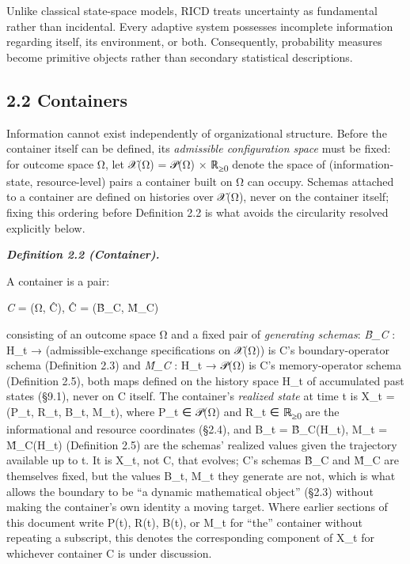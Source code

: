 \documentclass[
]{article}
\begin{document}
Unlike classical state-space models, RICD treats uncertainty as
fundamental rather than incidental. Every adaptive system possesses
incomplete information regarding itself, its environment, or both.
Consequently, probability measures become primitive objects rather than
secondary statistical descriptions.

\hypertarget{containers}{%
\subsection{2.2 Containers}\label{containers}}

Information cannot exist independently of organizational structure.
Before the container itself can be defined, its \emph{admissible
configuration space} must be fixed: for outcome space Ω, let 𝒳(Ω) = 𝒫(Ω)
× ℝ\textsubscript{≥0} denote the space of (information-state,
resource-level) pairs a container built on Ω can occupy. Schemas
attached to a container are defined on histories over 𝒳(Ω), never on the
container itself; fixing this ordering before Definition 2.2 is what
avoids the circularity resolved explicitly below.

\emph{\textbf{Definition 2.2 (Container).}}

A container is a pair:

\emph{C} = (Ω, Ĉ), Ĉ = (B̂\_C, M̂\_C)

consisting of an outcome space Ω and a fixed pair of \emph{generating
schemas}: \emph{B̂\_C} : H\_t → (admissible-exchange specifications on
𝒳(Ω)) is C's boundary-operator schema (Definition 2.3) and \emph{M̂\_C} :
H\_t → 𝒫(Ω) is C's memory-operator schema (Definition 2.5), both maps
defined on the history space H\_t of accumulated past states (§9.1),
never on C itself. The container's \emph{realized state} at time t is
X\_t = (P\_t, R\_t, B\_t, M\_t), where P\_t ∈ 𝒫(Ω) and R\_t ∈
ℝ\textsubscript{≥0} are the informational and resource coordinates
(§2.4), and B\_t = B̂\_C(H\_t), M\_t = M̂\_C(H\_t) (Definition 2.5) are
the schemas' realized values given the trajectory available up to t. It
is X\_t, not C, that evolves; C's schemas B̂\_C and M̂\_C are themselves
fixed, but the values B\_t, M\_t they generate are not, which is what
allows the boundary to be ``a dynamic mathematical object'' (§2.3)
without making the container's own identity a moving target. Where
earlier sections of this document write P(t), R(t), B(t), or M\_t for
``the'' container without repeating a subscript, this denotes the
corresponding component of X\_t for whichever container C is under
discussion.
\end{document}
